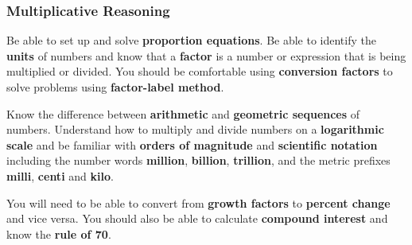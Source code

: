 \documentclass[11pt,answers]{exam}
\begin{document}
\subsubsection*{Multiplicative Reasoning}

Be able to set up and solve \textbf{proportion equations}.  Be able to identify the \textbf{units} of numbers and know that a \textbf{factor} is a number or expression that is being multiplied or divided.  You should be comfortable using \textbf{conversion factors} to solve problems using \textbf{factor-label method}.  

Know the difference between \textbf{arithmetic} and \textbf{geometric sequences} of numbers.  Understand how to multiply and divide numbers on a \textbf{logarithmic scale} and be familiar with \textbf{orders of magnitude} and \textbf{scientific notation} including the number words \textbf{million}, \textbf{billion}, \textbf{trillion}, and the metric prefixes \textbf{milli}, \textbf{centi} and \textbf{kilo}.  

You will need to be able to convert from \textbf{growth factors} to \textbf{percent change} and vice versa. You should also be able to calculate \textbf{compound interest} and know the \textbf{rule of 70}.   
\end{document}
